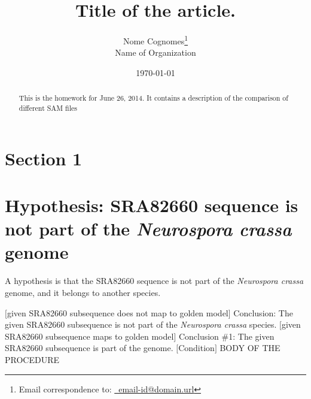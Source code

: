 \documentclass[letter,12pt]{article}
\begin{document}
\title{Title of the article.}
\date{\today}
\author{Nome Cognomes\thanks{Email correspondence to: \href{mailto:email-id@domain.url}{\Email\ email-id@domain.url}}\\
	Name of Organization
}
\maketitle


\begin{abstract} 
This is the homework for June 26, 2014. It contains a description of the comparison of different SAM files
\end{abstract}





\section{Section 1}
\label{sec:mysection1}


\section{Hypothesis: SRA82660 sequence is not part of the {\it Neurospora crassa} genome}
\label{sec:Hypothesis}


A hypothesis is that the SRA82660 sequence is not part of the {\it Neurospora crassa} genome, and it belongs to another species.


\begin{codebox}
\label{lst:LABEL}
\zi {}
\li	\If $[$given SRA82660 subsequence does not map to golden model$]$
	\Then
\li		Conclusion: The given SRA82660 subsequence is not part of the {\it Neurospora crassa} species.
\li	\ElseIf $[$given SRA82660 subsequence maps to golden model$]$
	\Then
\li		Conclusion \#1: The given SRA82660 subsequence is part of the genome.
\li	\ElseNoIf $[$Condition$]$
\li	
\li	\Else
\li	
	\End
\li BODY OF THE PROCEDURE
\zi	{}
\li	\Return
\end{codebox}
\end{document}
